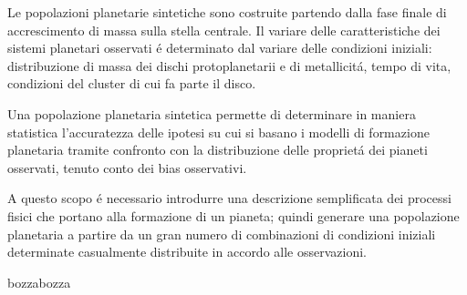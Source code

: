 \documentclass[twoside,11pt,fleqn]{memoir}%
\def\versione{bozza}%
\def\bozza{bozza}
\begin{document}
Le popolazioni planetarie sintetiche sono costruite partendo dalla fase finale di accrescimento di massa sulla stella centrale. Il variare delle caratteristiche dei sistemi planetari osservati \'e determinato dal variare delle condizioni iniziali: distribuzione di massa dei dischi protoplanetarii e di metallicit\'a, tempo di vita, condizioni del cluster di cui fa parte il disco.

Una popolazione planetaria sintetica permette di determinare in maniera statistica l'accuratezza delle ipotesi su cui si basano i modelli di formazione planetaria tramite confronto con la distribuzione delle propriet\'a dei pianeti osservati, tenuto conto dei bias osservativi.

A questo scopo  \'e necessario introdurre una descrizione semplificata dei processi fisici che portano alla formazione di un pianeta; quindi generare una popolazione planetaria a partire da un gran numero di combinazioni di condizioni iniziali determinate casualmente distribuite in accordo alle osservazioni.


\cleartorecto



{\let\clearpage\relax\let\cleardoublepage\relax
\backmatter
}

%
\printbibliography
\ifx\versione\bozza
\woc
\erratac
\fi
\end{document}

